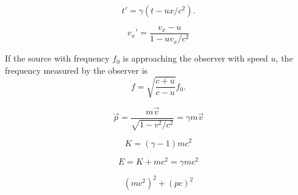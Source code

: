 \documentclass[nobib,notoc]{tufte-handout}
\begin{document}
\begin{defi}
	\begin{equation*}
		t'=\gamma(t-ux/c^2).
	\end{equation*}
\end{defi}
\begin{defi}
	\begin{equation*}
		v_x'=\frac{v_x-u}{1-uv_x/c^2}
	\end{equation*}
\end{defi}
\begin{defi}
	If the source with frequency \(f_0\) is approaching the observer with speed \(u\), the frequency measured by the observer is
	\begin{equation*}
		f=\sqrt{\frac{c+u}{c-u}}f_0.
	\end{equation*}
\end{defi}
\begin{defi}
	\begin{equation*}
		\vec{p}=\frac{m\vec{v}}{\sqrt{1-v^2/c^2}}=\gamma m\vec{v}
	\end{equation*}
\end{defi}
\begin{defi}
	\begin{equation*}
		K=(\gamma-1)mc^2
	\end{equation*}
\end{defi}
\begin{defi}
	\begin{equation*}
		E=K+mc^2=\gamma mc^2
	\end{equation*}
\end{defi}
\begin{defi}
	\begin{equation*}
		(mc^2)^2+(pc)^2
	\end{equation*}
\end{defi}
\end{document}
